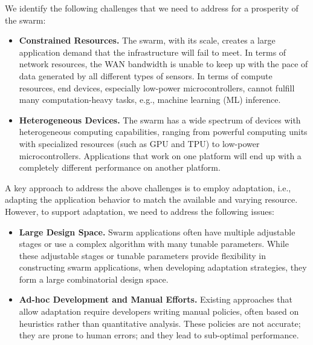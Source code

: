 \documentclass[thesis.tex]{subfiles}
\begin{document}
We identify the following challenges that we need to address for a prosperity of
the swarm:

\begin{itemize}[topsep=5pt, itemsep=2pt, leftmargin=10pt]

\item \textbf{Constrained Resources.} The swarm, with its scale, creates a large
  application demand that the infrastructure will fail to meet. In terms of
  network resources, the WAN bandwidth is unable to keep up with the pace of
  data generated by all different types of sensors. In terms of compute
  resources, end devices, especially low-power microcontrollers, cannot fulfill
  many computation-heavy tasks, e.g., machine learning (ML) inference.

\item \textbf{Heterogeneous Devices.} The swarm has a wide spectrum of devices
  with heterogeneous computing capabilities, ranging from powerful computing
  units with specialized resources (such as GPU and TPU) to low-power
  microcontrollers. Applications that work on one platform will end up with a
  completely different performance on another platform.

\end{itemize}

A key approach to address the above challenges is to employ adaptation, i.e.,
adapting the application behavior to match the available and varying
resource. However, to support adaptation, we need to address the following
issues:

\begin{itemize}[topsep=5pt, itemsep=2pt, leftmargin=10pt]

\item \textbf{Large Design Space.} Swarm applications often have multiple
  adjustable stages or use a complex algorithm with many tunable
  parameters. While these adjustable stages or tunable parameters provide
  flexibility in constructing swarm applications, when developing adaptation
  strategies, they form a large combinatorial design space.

\item \textbf{Ad-hoc Development and Manual Efforts.} Existing approaches that
  allow adaptation require developers writing manual policies, often based on
  heuristics rather than quantitative analysis. These policies are not accurate;
  they are prone to human errors; and they lead to sub-optimal performance.

\end{itemize}
\end{document}
